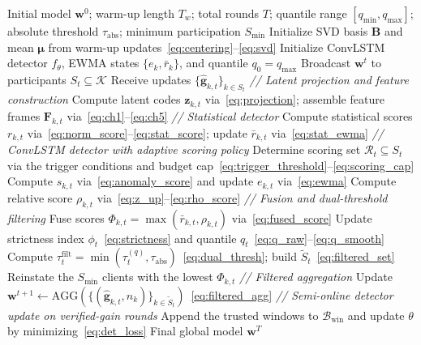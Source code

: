 \documentclass[journal]{IEEEtran}
\begin{document}
\begin{algorithm}[t]
\caption{USTAD-FL: Unsupervised Spatio-Temporal Anomaly Detection at the BS}
\label{alg:ustad}
\begin{algorithmic}[1]
\REQUIRE Initial model $\mathbf{w}^{0}$; warm-up length $T_w$; total rounds $T$; quantile range $[q_{\min},q_{\max}]$; absolute threshold $\tau_{\mathrm{abs}}$; minimum participation $S_{\min}$
\STATE Initialize SVD basis $\mathbf{B}$ and mean $\boldsymbol{\mu}$ from warm-up updates~\eqref{eq:centering}--\eqref{eq:svd}
\STATE Initialize ConvLSTM detector $f_\theta$, EWMA states $\{e_{k},\bar r_{k}\}$, and quantile $q_{0}\!=\!q_{\max}$
    \STATE Broadcast $\mathbf{w}^{t}$ to participants $S_t \subseteq \mathcal{K}$
    \STATE Receive updates $\{\hat{\mathbf{g}}_{k,t}\}_{k\in S_t}$
    \STATE \textit{// Latent projection and feature construction}
    \STATE Compute latent codes $\mathbf{z}_{k,t}$ via~\eqref{eq:projection}; assemble feature frames $\mathbf{F}_{k,t}$ via~\eqref{eq:ch1}--\eqref{eq:ch5}
    \STATE \textit{// Statistical detector}
    \STATE Compute statistical scores $r_{k,t}$ via~\eqref{eq:norm_score}--\eqref{eq:stat_score}; update $\bar r_{k,t}$ via~\eqref{eq:stat_ewma}
    \STATE \textit{// ConvLSTM detector with adaptive scoring policy}
    \STATE Determine scoring set $\mathcal{R}_t \subseteq S_t$ via the trigger conditions and budget cap~\eqref{eq:trigger_threshold}--\eqref{eq:scoring_cap}
        \STATE Compute $s_{k,t}$ via~\eqref{eq:anomaly_score} and update $e_{k,t}$ via~\eqref{eq:ewma}
    \ENDFOR
    \STATE Compute relative score $\rho_{k,t}$ via~\eqref{eq:z_up}--\eqref{eq:rho_score}
    \STATE \textit{// Fusion and dual-threshold filtering}
    \STATE Fuse scores $\Phi_{k,t} \!=\! \max(\bar r_{k,t}, \rho_{k,t})$ via~\eqref{eq:fused_score}
    \STATE Update strictness index $\phi_t$~\eqref{eq:strictness} and quantile $q_t$~\eqref{eq:q_raw}--\eqref{eq:q_smooth}
    \STATE Compute $\tau_t^{\mathrm{filt}} = \min(\tau_t^{(q)}, \tau_{\mathrm{abs}})$~\eqref{eq:dual_thresh}; build $\widetilde{S}_t$~\eqref{eq:filtered_set}
        \STATE Reinstate the $S_{\min}$ clients with the lowest $\Phi_{k,t}$
    \ENDIF
    \STATE \textit{// Filtered aggregation}
    \STATE Update $\mathbf{w}^{t+1} \!\leftarrow\! \text{AGG}(\{(\hat{\mathbf{g}}_{k,t},n_k)\}_{k\in\widetilde{S}_t})$~\eqref{eq:filtered_agg}
    \STATE \textit{// Semi-online detector update on verified-gain rounds}
        \STATE Append the trusted windows to $\mathcal{B}_{\mathrm{win}}$ and update $\theta$ by minimizing~\eqref{eq:det_loss}
    \ENDIF
\ENDFOR
\RETURN Final global model $\mathbf{w}^{T}$
\end{algorithmic}
\end{algorithm}
\end{document}
